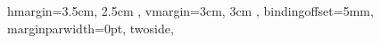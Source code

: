 {{                  %
   hmargin={3.5cm, 2.5cm },     %
   vmargin={3cm, 3cm },     %
   bindingoffset=5mm,  %
   marginparwidth=0pt, %
   twoside,
}
} %

